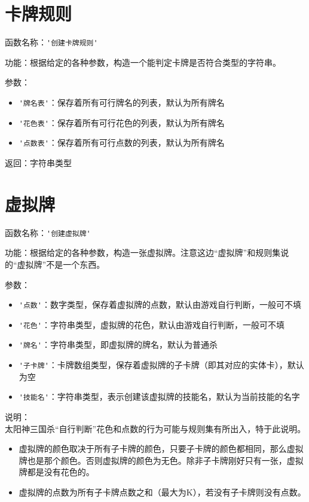 \section{卡牌规则}

函数名称：\verb|'创建卡牌规则'|

功能：根据给定的各种参数，构造一个能判定卡牌是否符合类型的字符串。

参数：

\begin{itemize}
  \item \verb|'牌名表'|：保存着所有可行牌名的列表，默认为所有牌名
  \item \verb|'花色表'|：保存着所有可行花色的列表，默认为所有牌名
  \item \verb|'点数表'|：保存着所有可行点数的列表，默认为所有牌名
\end{itemize}

返回：字符串类型

\section{虚拟牌}

函数名称：\verb|'创建虚拟牌'|

功能：根据给定的各种参数，构造一张虚拟牌。注意这边“虚拟牌”和规则集说的“虚拟牌”不是一个东西。

参数：

\begin{itemize}
  \item \verb|'点数'|：数字类型，保存着虚拟牌的点数，默认由游戏自行判断，一般可不填
  \item \verb|'花色'|：字符串类型，虚拟牌的花色，默认由游戏自行判断，一般可不填
  \item \verb|'牌名'|：字符串类型，即虚拟牌的牌名，默认为普通杀
  \item \verb|'子卡牌'|：卡牌数组类型，保存着虚拟牌的子卡牌（即其对应的实体卡），默认为空
  \item \verb|'技能名'|：字符串类型，表示创建该虚拟牌的技能名，默认为当前技能的名字
\end{itemize}

说明：\\

太阳神三国杀“自行判断”花色和点数的行为可能与规则集有所出入，特于此说明。

\begin{itemize}
 \item 虚拟牌的颜色取决于所有子卡牌的颜色，只要子卡牌的颜色都相同，那么虚拟牌也是那个颜色。否则虚拟牌的颜色为无色。除非子卡牌刚好只有一张，虚拟牌都是没有花色的。
 \item 虚拟牌的点数为所有子卡牌点数之和（最大为K），若没有子卡牌则没有点数。
\end{itemize}

